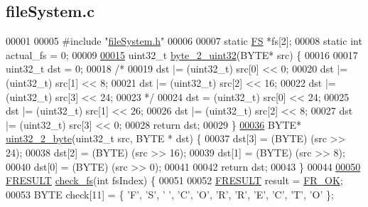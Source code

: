 \hypertarget{fileSystem_8c_source}{\subsection{file\+System.\+c}
\label{fileSystem_8c_source}
}

\begin{DoxyCode}
00001 
00005 \textcolor{preprocessor}{#include "\hyperlink{fileSystem_8h}{fileSystem.h}"}
00006 
00007 \textcolor{keyword}{static} \hyperlink{structFS}{FS} *fs[2];
00008 \textcolor{keyword}{static} \textcolor{keywordtype}{int} actual\_fs = 0;
00009 
\hypertarget{fileSystem_8c_source_l00015}{}\hyperlink{fileSystem_8c_a3a0f60af901aa1945ab943e63fbd06d0}{00015} uint32\_t \hyperlink{fileSystem_8c_a3a0f60af901aa1945ab943e63fbd06d0}{byte\_2\_uint32}(BYTE* src) \{
00016 
00017   uint32\_t dst = 0;
00018   \textcolor{comment}{/*}
00019 \textcolor{comment}{   dst |= (uint32\_t) src[0] << 0;}
00020 \textcolor{comment}{   dst |= (uint32\_t) src[1] << 8;}
00021 \textcolor{comment}{   dst |= (uint32\_t) src[2] << 16;}
00022 \textcolor{comment}{   dst |= (uint32\_t) src[3] << 24;}
00023 \textcolor{comment}{   */}
00024   dst = (uint32\_t) src[0] << 24;
00025   dst |= (uint32\_t) src[1] << 26;
00026   dst |= (uint32\_t) src[2] << 8;
00027   dst |= (uint32\_t) src[3] << 0;
00028   \textcolor{keywordflow}{return} dst;
00029 \}
\hypertarget{fileSystem_8c_source_l00036}{}\hyperlink{fileSystem_8c_a3623bef990ae28b977811f039ee158bb}{00036} BYTE* \hyperlink{fileSystem_8c_a3623bef990ae28b977811f039ee158bb}{uint32\_2\_byte}(uint32\_t src, BYTE * dst) \{
00037   dst[3] = (BYTE) (src >> 24);
00038   dst[2] = (BYTE) (src >> 16);
00039   dst[1] = (BYTE) (src >> 8);
00040   dst[0] = (BYTE) (src >> 0);
00041 
00042   \textcolor{keywordflow}{return} dst;
00043 \}
00044 
\hypertarget{fileSystem_8c_source_l00050}{}\hyperlink{fileSystem_8c_aaa2cbdb65e6f30c0a2a3e5761eea1ef8}{00050} \hyperlink{fileSystem_8h_a49d0171ecbd362cda5680a0d360db44c}{FRESULT} \hyperlink{fileSystem_8c_aaa2cbdb65e6f30c0a2a3e5761eea1ef8}{check\_fs}(\textcolor{keywordtype}{int} fsIndex) \{
00051 
00052   \hyperlink{fileSystem_8h_a49d0171ecbd362cda5680a0d360db44c}{FRESULT} result = \hyperlink{fileSystem_8h_a49d0171ecbd362cda5680a0d360db44ca62fce5cd9df008f8fc85f99706bda5f1}{FR\_OK};
00053   BYTE check[11] = \{ \textcolor{charliteral}{'F'}, \textcolor{charliteral}{'S'}, \textcolor{charliteral}{' '}, \textcolor{charliteral}{'C'}, \textcolor{charliteral}{'O'}, \textcolor{charliteral}{'R'}, \textcolor{charliteral}{'R'}, \textcolor{charliteral}{'E'}, \textcolor{charliteral}{'C'}, \textcolor{charliteral}{'T'}, \textcolor{charliteral}{'O'} \};

\end{DoxyCode}
